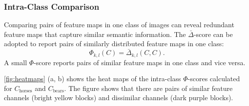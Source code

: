 \subsubsection{Intra-Class Comparison}

Comparing pairs of feature maps in one class of images can reveal redundant feature maps that capture similar semantic information. The $\bar{\Delta}$-score can be adopted to report pairs of similarly distributed feature maps in one class:
\begin{equation}
    \Phi_{k,l}(C) = \bar{\Delta}_{k,l} (C, C).
\end{equation}
A small $\Phi$-score reports pairs of similar feature maps in one class and vice versa.

\autoref{fig:heatmaps} (a, b) shows the heat maps of the intra-class $\Phi$-scores calculated for $C_{\text{horses}}$ and $C_{\text{bears}}$. The figure shows that there are pairs of similar feature channels (bright yellow blocks) and dissimilar channels (dark purple blocks).

